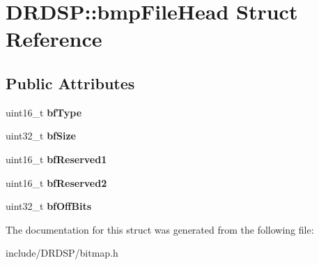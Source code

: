 \hypertarget{struct_d_r_d_s_p_1_1bmp_file_head}{\section{D\-R\-D\-S\-P\-:\-:bmp\-File\-Head Struct Reference}
\label{struct_d_r_d_s_p_1_1bmp_file_head}
}
\subsection*{Public Attributes}
\begin{DoxyCompactItemize}
\item 
\hypertarget{struct_d_r_d_s_p_1_1bmp_file_head_ae8a101eb4f8098b251a62b3088e384c4}{uint16\-\_\-t {\bfseries bf\-Type}}\label{struct_d_r_d_s_p_1_1bmp_file_head_ae8a101eb4f8098b251a62b3088e384c4}

\item 
\hypertarget{struct_d_r_d_s_p_1_1bmp_file_head_a014eb0ab5ccc7782a16cb00f279bd348}{uint32\-\_\-t {\bfseries bf\-Size}}\label{struct_d_r_d_s_p_1_1bmp_file_head_a014eb0ab5ccc7782a16cb00f279bd348}

\item 
\hypertarget{struct_d_r_d_s_p_1_1bmp_file_head_aadb41d1e1a2e0f836157d1ad80383ace}{uint16\-\_\-t {\bfseries bf\-Reserved1}}\label{struct_d_r_d_s_p_1_1bmp_file_head_aadb41d1e1a2e0f836157d1ad80383ace}

\item 
\hypertarget{struct_d_r_d_s_p_1_1bmp_file_head_a9953578374412dcc4963e571dffaa036}{uint16\-\_\-t {\bfseries bf\-Reserved2}}\label{struct_d_r_d_s_p_1_1bmp_file_head_a9953578374412dcc4963e571dffaa036}

\item 
\hypertarget{struct_d_r_d_s_p_1_1bmp_file_head_a1e9de28a4efcb735f2250106dfe9a92e}{uint32\-\_\-t {\bfseries bf\-Off\-Bits}}\label{struct_d_r_d_s_p_1_1bmp_file_head_a1e9de28a4efcb735f2250106dfe9a92e}

\end{DoxyCompactItemize}


The documentation for this struct was generated from the following file\-:\begin{DoxyCompactItemize}
\item 
include/\-D\-R\-D\-S\-P/bitmap.\-h\end{DoxyCompactItemize}
